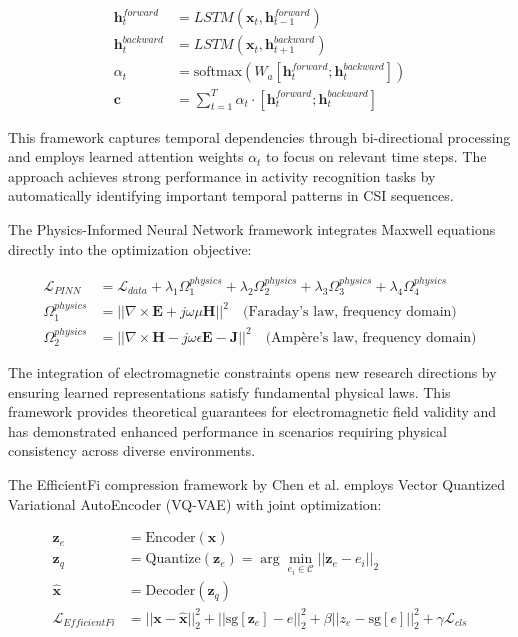 \documentclass[journal]{IEEEtran}
\begin{document}
\begin{align}
\mathbf{h}_t^{forward} &= LSTM(\mathbf{x}_t, \mathbf{h}_{t-1}^{forward}) \label{eq:lstm_forward} \\
\mathbf{h}_t^{backward} &= LSTM(\mathbf{x}_t, \mathbf{h}_{t+1}^{backward}) \label{eq:lstm_backward} \\
\alpha_t &= \text{softmax}(W_a[\mathbf{h}_t^{forward}; \mathbf{h}_t^{backward}]) \label{eq:attention_weights} \\
\mathbf{c} &= \sum_{t=1}^T \alpha_t \cdot [\mathbf{h}_t^{forward}; \mathbf{h}_t^{backward}] \label{eq:context_vector}
\end{align}

This framework captures temporal dependencies through bi-directional processing and employs learned attention weights $\alpha_t$ to focus on relevant time steps. The approach achieves strong performance in activity recognition tasks by automatically identifying important temporal patterns in CSI sequences.

The Physics-Informed Neural Network framework integrates Maxwell equations directly into the optimization objective:

\begin{align}
\mathcal{L}_{PINN} &= \mathcal{L}_{data} + \lambda_1 \Omega_1^{physics} + \lambda_2 \Omega_2^{physics} + \lambda_3 \Omega_3^{physics} + \lambda_4 \Omega_4^{physics} \label{eq:pinn_complete} \\
\Omega_1^{physics} &= \left|\left|\nabla \times \mathbf{E} + j\omega \mu \mathbf{H}\right|\right|^2 \quad \text{(Faraday's law, frequency domain)} \label{eq:faraday_loss} \\
\Omega_2^{physics} &= \left|\left|\nabla \times \mathbf{H} - j\omega \epsilon \mathbf{E} - \mathbf{J}\right|\right|^2 \quad \text{(Ampère's law, frequency domain)} \label{eq:ampere_loss}
\end{align}

The integration of electromagnetic constraints opens new research directions by ensuring learned representations satisfy fundamental physical laws. This framework provides theoretical guarantees for electromagnetic field validity and has demonstrated enhanced performance in scenarios requiring physical consistency across diverse environments.

The EfficientFi compression framework by Chen et al. \cite{chen2024efficientfi} employs Vector Quantized Variational AutoEncoder (VQ-VAE) with joint optimization:

\begin{align}
\mathbf{z}_e &= \text{Encoder}(\mathbf{x}) \label{eq:vq_encoder} \\
\mathbf{z}_q &= \text{Quantize}(\mathbf{z}_e) = \arg\min_{e_i \in \mathcal{C}} ||\mathbf{z}_e - e_i||_2 \label{eq:vector_quantization} \\
\hat{\mathbf{x}} &= \text{Decoder}(\mathbf{z}_q) \label{eq:vq_decoder} \\
\mathcal{L}_{EfficientFi} &= ||\mathbf{x} - \hat{\mathbf{x}}||_2^2 + ||\text{sg}[\mathbf{z}_e] - e||_2^2 + \beta||z_e - \text{sg}[e]||_2^2 + \gamma \mathcal{L}_{cls} \label{eq:efficientfi_loss}
\end{align}
\end{document}
